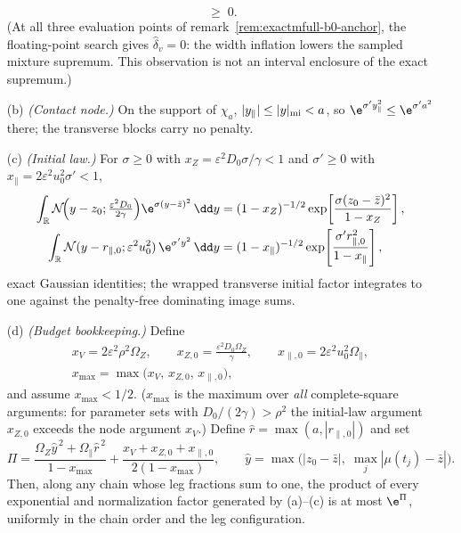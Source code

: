 \begin{lemma}
\begin{enumerate}
\begin{equation}
 \;\ge\;0 .
 \label{eq:exactmfull-b0-deltav}
\end{equation}
(At all three evaluation points of remark~\ref{rem:exactmfull-b0-anchor},
the floating-point search gives \(\widehat\delta_v=0\): the width inflation
lowers the sampled mixture supremum.  This observation is not an interval
enclosure of the exact supremum.)
\item[(b)] \emph{(Contact node.)}  On the support of \(\chi_a\),
\(|y_\parallel|\le|y|_{\rm mi}<a\), so
\(\e^{\sigma'y_\parallel^2}\le\e^{\sigma'a^2}\) there; the transverse
blocks carry no penalty.
\item[(c)] \emph{(Initial law.)}  For \(\sigma\ge0\) with
\(x_Z=\varepsilon^2D_0\sigma/\gamma<1\) and \(\sigma'\ge0\) with
\(x_\parallel=2\varepsilon^2u_0^2\sigma'<1\),
\begin{equation}
 \begin{aligned}
 \int_{\mathbb R}
 \mathcal N\!\Bigl(y-z_0;\tfrac{\varepsilon^2D_0}{2\gamma}\Bigr)
 \e^{\sigma(y-\bar z)^2}\,\dd y
 &=(1-x_Z)^{-1/2}
 \exp\!\left[\frac{\sigma(z_0-\bar z)^2}{1-x_Z}\right],\\
 \int_{\mathbb R}
 \mathcal N(y-r_{\parallel,0};\varepsilon^2u_0^2)\,
 \e^{\sigma'y^2}\,\dd y
 &=(1-x_\parallel)^{-1/2}
 \exp\!\left[\frac{\sigma'r_{\parallel,0}^2}{1-x_\parallel}\right],
 \end{aligned}
 \label{eq:exactmfull-b0-initlaw}
\end{equation}
exact Gaussian identities; the wrapped transverse initial factor integrates
to one against the penalty-free dominating image sums.
\item[(d)] \emph{(Budget bookkeeping.)}  Define
\begin{equation}
 \begin{gathered}
 x_V=2\varepsilon^2\rho^2\Omega_Z,
 \qquad
 x_{Z,0}=\frac{\varepsilon^2D_0\Omega_Z}{\gamma},
 \qquad
 x_{\parallel,0}=2\varepsilon^2u_0^2\Omega_\parallel,\\
 x_{\max}=\max\bigl(x_V,\,x_{Z,0},\,x_{\parallel,0}\bigr),
 \end{gathered}
 \label{eq:exactmfull-b0-xmax}
\end{equation}
and assume \(x_{\max}<1/2\).  (\(x_{\max}\) is the maximum over \emph{all}
complete-square arguments: for parameter sets with
\(D_0/(2\gamma)>\rho^2\) the initial-law argument \(x_{Z,0}\) exceeds the
node argument \(x_V\).)  Define
\(\hat r=\max(a,|r_{\parallel,0}|)\) and set
\begin{equation}
 \Pi
 =\frac{\Omega_Z\hat y^{\,2}+\Omega_\parallel\hat r^{\,2}}{1-x_{\max}}
 +\frac{x_V+x_{Z,0}+x_{\parallel,0}}{2(1-x_{\max})},
 \qquad
 \hat y=\max\bigl(|z_0-\bar z|,\;\max_j|\mu(t_j)-\bar z|\bigr).
 \label{eq:exactmfull-b0-Pi}
\end{equation}
Then, along any chain whose leg fractions sum to one, the product of every
exponential and normalization factor generated by (a)--(c) is at most
\(\e^{\Pi}\), uniformly in the chain order and the leg configuration.
\end{enumerate}
\end{lemma}

